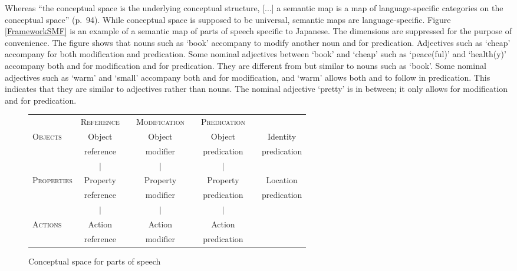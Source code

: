 Whereas
``the conceptual space is the underlying conceptual structure,
[...] a semantic map is a map of language-specific categories on the conceptual space'' (p.\ 94).
While conceptual space is supposed to be universal,
semantic maps are language-specific.
Figure \ref{FrameworkSMF} is an example of a semantic map of parts of speech specific to Japanese.
The dimensions are suppressed for the purpose of convenience.
The figure shows that
nouns such as  `book' accompany  to modify another noun and  for predication. %
Adjectives such as  `cheap' accompany  for both modification and predication. %
Some nominal adjectives between `book' and `cheap' such as  `peace(ful)' and  `health(y)' accompany both  and  for modification and  for predication.
They are different from but similar to nouns such as `book'.
Some nominal adjectives such as  `warm' and  `small' accompany both  and  for modification, and
`warm' allows both  and  to follow in predication.
This indicates that
they are similar to adjectives rather than nouns.
The nominal adjective  `pretty' is in between;
it only allows  for modification and  for predication.

\begin{figure}
 \centering
 \begin{tabular}{lclclclc}
             & \textsc{Reference} &  & \textsc{Modification} &  & \textsc{Predication} & & \\
 \textsc{Objects}     & Object    &  & Object       &  & Object      &  & Identity \\
\hhline{~~-~-~-~}
             & reference &  & modifier     &  & predication &  & predication \\
             & \hfill $|$ \hfill &  &  \hfill $|$ \hfill &  &  \hfill $|$ \hfill &  &  \\
 \textsc{Properties}  & Property  &  & Property     &  & Property    &  & Location \\
\hhline{~~-~-~-~}
             & reference &  & modifier     &  & predication &  & predication \\
             & \hfill $|$ \hfill &  &  \hfill $|$ \hfill &  &  \hfill $|$ \hfill &  &  \\
 \textsc{Actions}     & Action    &  & Action       &  & Action      &  &  \\
\hhline{~~-~-~~~}
             & reference &  & modifier     &  & predication &  &  \\
 \end{tabular}
 \caption{Conceptual space for parts of speech \cite[92]{croft01}}
 \label{FrameworkCSF}
\end{figure}

